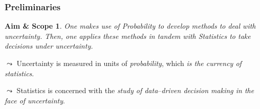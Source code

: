 \documentclass[notes=show,handout]{beamer}
\newtheorem{aes}{Aim \& Scope}[section]
\begin{document}
\begin{frame}
\frametitle{Preliminaries}

\begin{aes}

One makes use of Probability to develop methods to deal with uncertainty. Then, one applies these methods in tandem with Statistics to take  decisions under uncertainty.  
\end{aes}

\bigskip

$\leadsto$ Uncertainty is measured in units of \textit{probability},
which \textit{is the currency of statistics}. 

\bigskip


$\leadsto$ Statistics is concerned with %
the \textit{study of data}--\textit{driven decision making in the face of uncertainty}.

\end{frame}






%
%
%
%
%
%
%
%
%
%
%
%
\end{document}
